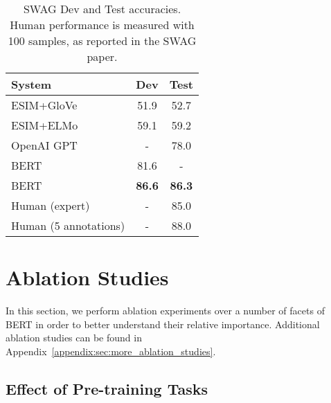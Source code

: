 \documentclass[11pt,a4paper]{article}
\newcommand\bertbase{BERT\xspace}
\newcommand\bertlarge{BERT\xspace}
\begin{document}
\begin{table}[tb]
\begin{center}
{
\small
 \begin{tabular}{lcc}
    \toprule
System             &  Dev    & Test\\ 
\midrule
ESIM+GloVe   & 51.9       & 52.7 \\
ESIM+ELMo    & 59.1       & 59.2 \\
OpenAI GPT    & -       & 78.0 \\
\midrule
\bertbase    & 81.6       &  - \\
\bertlarge   & {\bf 86.6} & {\bf 86.3} \\
\midrule
Human (expert) & - & 85.0 \\
Human (5 annotations)        & -          & 88.0 \\
\bottomrule
\end{tabular}
}
\caption{SWAG Dev and Test accuracies. 
Human performance is measured with 100 samples, as reported in the SWAG paper.}
\label{tab:swag_official}
\end{center}
\end{table}  
\section{Ablation Studies}
\label{sec:ablation}
In this section, we perform ablation experiments over a number of facets of BERT in order to better understand their relative importance. Additional ablation studies can be found in Appendix~\ref{appendix:sec:more_ablation_studies}.

\subsection{Effect of Pre-training Tasks}
\end{document}
